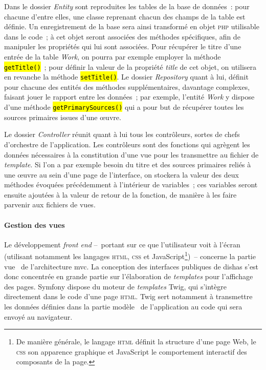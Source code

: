 \documentclass[a4paper,12pt,twoside]{book}
\let\OldTexttt\texttt
\renewcommand{\texttt}[1]{\OldTexttt{\hl{#1}}}
\newcommand{\eng}{\emph}
\newcommand{\bdd}{base de données\xspace}
\newcommand{\html}{\textsc{html}\xspace}
\newcommand{\php}{\textsc{php}\xspace}
\newcommand{\css}{\textsc{css}\xspace}
\newcommand{\g}[1]{\og#1~\fg}
\newcommand{\dishas}{\gls{dishas}\xspace}
\newcommand{\mvc}{\gls{mvc}\xspace}
\begin{document}
Dans le dossier \eng{Entity} sont reproduites les tables de la \bdd~: pour chacune d'entre elles, une classe reprenant chacun des champs de la table est définie. Un enregistrement de la base sera ainsi transformé en objet \php utilisable dans le code~; à cet objet seront associées des méthodes spécifiques, afin de manipuler les propriétés qui lui sont associées. Pour récupérer le titre d'une entrée de la table \eng{Work}, on pourra par exemple employer la méthode \texttt{getTitle()}~; pour définir la valeur de la propriété \eng{title} de cet objet, on utilisera en revanche la méthode \texttt{setTitle()}. Le dossier \eng{Repository} quant à lui, définit pour chacune des entités des méthodes supplémentaires, davantage complexes, faisant jouer le rapport entre les données~; par exemple, l'entité \eng{Work} y dispose d'une méthode \texttt{getPrimarySources()} qui a pour but de récupérer toutes les sources primaires issues d'une œuvre.

Le dossier \eng{Controller} réunit quant à lui tous les contrôleurs, sortes de chefs d'orchestre de l'application. Les contrôleurs sont des fonctions qui agrègent les données nécessaires à la constitution d'une vue pour les transmettre au fichier de \eng{template}. Si l'on a par exemple besoin du titre et des sources primaires reliés à une œuvre au sein d'une page de l'interface, on stockera la valeur des deux méthodes évoquées précédemment à l'intérieur de variables~; ces variables seront ensuite ajoutées à la valeur de retour de la fonction, de manière à les faire parvenir aux fichiers de vues.

				\paragraph{Gestion des vues}
Le développement \eng{front end} –~portant sur ce que l'utilisateur voit à l'écran (utilisant notamment les langages \html, \css et JavaScript\footnote{De manière générale, le langage \html définit la structure d'une page Web, le \css son apparence graphique et JavaScript le comportement interactif des composants de la page.})~– concerne la partie \g{vue} de l'architecture \mvc. La conception des interfaces publiques de \dishas s'est donc concentrée en grande partie sur l'élaboration de \eng{templates} pour l'affichage des pages. Symfony dispose du moteur de \eng{templates} Twig, qui s'intègre directement dans le code d'une page \html. Twig sert notamment à transmettre les données définies dans la partie \g{modèle} de l'application au code qui sera envoyé au navigateur.
\end{document}
